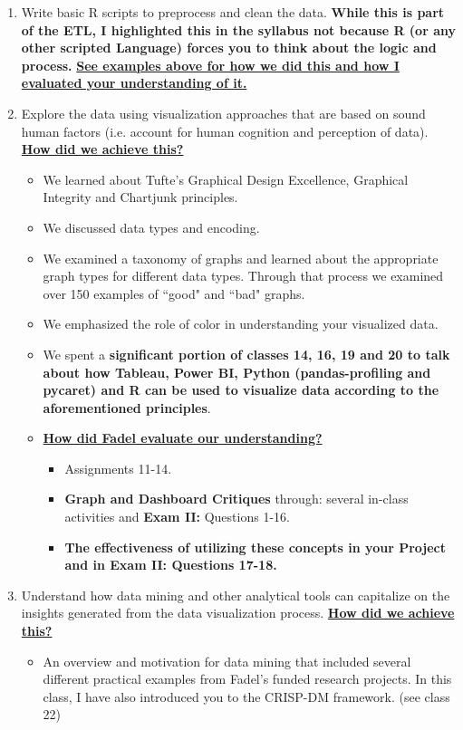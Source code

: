 \documentclass[letterpaper,12pt]{article}
\begin{document}
\begin{enumerate}[label=(\Alph*)]
\begin{itemize}[nosep]
	\end{itemize}
	\item Write basic R scripts to preprocess and clean the data. \textbf{While this is part of the ETL, I highlighted this in the syllabus not because \textbf{\textbf{R}} (or any other scripted Language) forces you to think about the logic and process.} \textbf{\ul{See examples above for how we did this and how I evaluated your understanding of it.}}
	\item Explore the data using visualization approaches that are based on sound human factors (i.e. account for human cognition and perception of data). \textbf{\ul{How did we achieve this?}}
	\begin{itemize}[nosep]
		\item We learned about Tufte's Graphical Design Excellence, Graphical Integrity and Chartjunk principles.
		\item We discussed data types and encoding. 
		\item We examined a taxonomy of graphs and learned about the appropriate graph types for different data types. Through that process we examined over 150 examples of ``good" and ``bad" graphs.
		\item We emphasized the role of color in understanding your visualized data. 
		\item We spent a \textbf{significant portion of classes 14, 16, 19 and 20 to talk about how Tableau, Power BI, Python (pandas-profiling and pycaret) and R can be used to visualize data according to the aforementioned principles}.
		\item \textbf{\ul{How did Fadel evaluate our understanding?}}
		\begin{itemize}
			\item Assignments 11-14.
			\item \textbf{Graph and Dashboard Critiques} through: several in-class activities and  \textbf{Exam II:} Questions 1-16.
			\item \textbf{The effectiveness of utilizing these concepts in your Project and in Exam II: Questions 17-18.}
		\end{itemize}
	\end{itemize}
	\item Understand how data mining and other analytical tools can capitalize on the insights generated from the data visualization process. \textbf{\ul{How did we achieve this?}}
	\begin{itemize}[nosep]
		\item An overview and motivation for data mining that included several different practical examples from Fadel's funded research projects. In this class, I have also introduced you to the CRISP-DM framework. (see class 22)

\end{itemize}
\end{enumerate}
\end{document}
